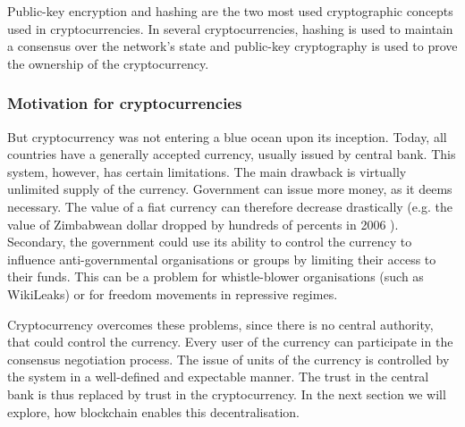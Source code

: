Public-key encryption and hashing are the two most used cryptographic concepts used in cryptocurrencies. In several cryptocurrencies, hashing is used to maintain a consensus over the network's state and public-key cryptography is used to prove the ownership of the cryptocurrency\footnotemark.
% 

\subsubsection{Motivation for cryptocurrencies}
But cryptocurrency was not entering a blue ocean upon its inception. Today, all countries have a generally accepted currency, usually issued by central bank. This system, however, has certain limitations. The main drawback is virtually unlimited supply of the currency. Government can issue more money, as it deems necessary. The value of a fiat currency can therefore decrease drastically (e.g. the value of Zimbabwean dollar dropped by hundreds of percents in 2006 \footnotemark). Secondary, the government could use its ability to control the currency to influence anti-governmental organisations or groups by limiting their access to their funds. This can be a problem for whistle-blower organisations (such as WikiLeaks) or for freedom movements in repressive regimes.
% 

Cryptocurrency overcomes these problems, since there is no central authority, that could control the currency. Every user of the currency can participate in the consensus negotiation process. The issue of units of the currency is controlled by the system in a well-defined and expectable manner. The trust in the central bank is thus replaced by trust in the cryptocurrency. In the next section we will explore, how blockchain enables this decentralisation.